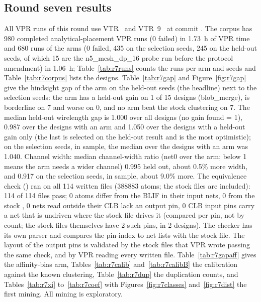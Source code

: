 \subsection{Round seven results}

\label{sec:r7-results}

All VPR runs of this round use VTR~\cite{rose2012vtr} and VTR~9~\cite{elgammal2025vtr9} at commit . The corpus has 980 completed analytical-placement VPR runs (0 failed) in 1.73~h of VPR time and 680 runs of the  arms (0 failed, 435 on the selection seeds, 245 on the held-out seeds, of which 15 are the n5\_mesh\_dp\_16 probe run before the protocol amendment) in 1.06~h; Table~\ref{tab:r7runs} counts the runs per arm and seeds and Table~\ref{tab:r7corpus} lists the designs. Table~\ref{tab:r7gap} and Figure~\ref{fig:r7gap} give the hindsight gap of the  arm on the held-out seeds (the headline) next to the selection seeds: the arm has a held-out gain on 1 of 15 designs (blob\_merge), is borderline on 7 and worse on 0, and no arm beat the stock clustering on 7. The median held-out wirelength gap is 1.000 over all designs (no gain found = 1), 0.987 over the designs with an arm and 1.050 over the designs with a held-out gain only (the last is selected on the held-out result and is the most optimistic); on the selection seeds, in sample, the median over the designs with an arm was 1.040. Channel width: median channel-width ratio (net0 over the arm; below 1 means the arm needs a wider channel) 0.995 held out, about 0.5\% more width, and 0.917 on the selection seeds, in sample, about 9.0\% more. The equivalence check () ran on all 114 written  files (388883 atoms; the stock files are included): 114 of 114 files pass; 0 atoms differ from the BLIF in their input nets, 0 from the stock , 0 nets read outside their CLB lack an output pin, 0 CLB input pins carry a net that is undriven where the stock file drives it (compared per pin, not by count; the stock files themselves have 2 such pins, in 2 designs). The checker has its own parser and compares the pin-index to net lists with the stock file. The layout of the  output pins is validated by the stock  files that VPR wrote passing the same check, and by VPR reading every written file. Table~\ref{tab:r7gapaff} gives the affinity-bias arm, Tables~\ref{tab:r7calib} and~\ref{tab:r7calibB} the calibration against the known clustering, Table~\ref{tab:r7dup} the duplication counts, and Tables~\ref{tab:r7xi} to~\ref{tab:r7coef} with Figures~\ref{fig:r7classes} and~\ref{fig:r7dist} the first mining. All mining is exploratory.

